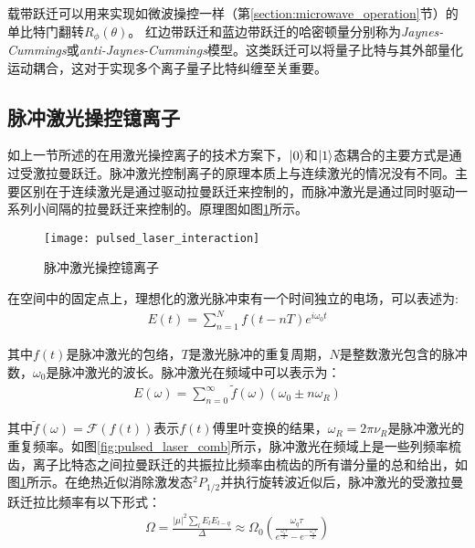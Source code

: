 载带跃迁可以用来实现如微波操控一样（第\ref{section:microwave_operation}节）的单比特门翻转$R_\phi(\theta)$。
红边带跃迁和蓝边带跃迁的哈密顿量分别称为\emph{Jaynes-Cummings}或\emph{anti-Jaynes-Cummings}模型\cite[]{Karnieli_Fan_2023}。这类跃迁可以将量子比特与其外部量化运动耦合，这对于实现多个离子量子比特纠缠至关重要。
\subsection[脉冲激光操控镱离子]{脉冲激光操控镱离子\label{section:pulsed_laser_ion_operation}}
如上一节所述的在用激光操控离子的技术方案下，$\ket{0}$和$\ket{1}$态耦合的主要方式是通过受激拉曼跃迁。脉冲激光控制离子的原理本质上与连续激光的情况没有不同。主要区别在于连续激光是通过驱动拉曼跃迁来控制的，而脉冲激光是通过同时驱动一系列小间隔的拉曼跃迁来控制的。原理图如图\ref{fig:pulsed_laser_interaction}所示。
\begin{figure}
    \centering
    \caption[脉冲激光操控镱离子]{脉冲激光操控镱离子\label{fig:pulsed_laser_interaction}}
    \texttt{[image: pulsed\_laser\_interaction]}
\end{figure}

在空间中的固定点上，理想化的激光脉冲束有一个时间独立的电场，可以表述为:
\begin{align}
    E(t)=\sum_{n=1}^{N}f(t-nT)e^{i\omega_0t}
\end{align}

其中$f(t)$是脉冲激光的包络，$T$是激光脉冲的重复周期，$N
$是整数激光包含的脉冲数，$\omega_0$是脉冲激光的波长。脉冲激光在频域中可以表示为：
\begin{align}
    E(\omega)=\sum_{n=0}^{\infty}\tilde{f}(\omega)(\omega_0\pm n\omega_R)
\end{align}

其中$\tilde{f}(\omega)=\mathcal{F}(f(t))$表示$f(t)$傅里叶变换的结果，$\omega_R=2\pi\nu_R$是脉冲激光的重复频率。如图\ref{fig:pulsed_laser_comb}所示，脉冲激光在频域上是一些列频率梳齿，离子比特态之间拉曼跃迁的共振拉比频率由梳齿的所有谱分量的总和给出，如图\ref{fig:pulsed_laser_interaction}所示。在绝热近似消除激发态$^2P_{1/2}$并执行旋转波近似后，脉冲激光的受激拉曼跃迁拉比频率有以下形式\cite[]{Hayes_Matsukevich_Maunz_Hucul_Quraishi_Olmschenk_Campbell_Mizrahi_Senko_Monroe_2010}：
\begin{align}
    \Omega=\frac{|\mu|^2\sum_{l}^{}E_lE_{l-q}}{\Delta}\approx\Omega_0\left(\frac{\omega_q\tau}{e^{\frac{\omega_q\tau}{2}}-e^{-\frac{\omega_q\tau}{2}}}\right)
\end{align}

